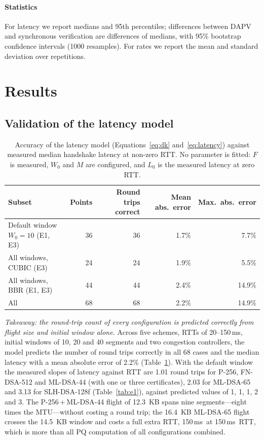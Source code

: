 \documentclass[preprint,10pt,3p]{elsarticle}
\newcommand{\ms}{\,ms}
\begin{document}
\paragraph{Statistics} For latency we report medians and 95th percentiles;
differences between DAPV and synchronous verification are differences of
medians, with 95\% bootstrap confidence intervals (1000 resamples).  For
rates we report the mean and standard deviation over repetitions.

\section{Results}
\label{sec:results}

\subsection{Validation of the latency model}
\label{sec:res_model}

\begin{table}[t]
\centering
\caption{Accuracy of the latency model (Equations~\eqref{eq:dk}
  and~\eqref{eq:latency}) against measured median handshake latency at
  non-zero RTT.  No parameter is fitted: $F$ is measured,
  $W_0$ and $M$ are configured, and $L_0$ is the measured latency at zero
  RTT.}
\label{tab:model}
\small
\begin{tabular}{lrrrr}
\toprule
\textbf{Subset} & \textbf{Points} & \textbf{Round trips correct} &
  \textbf{Mean abs.\ error} & \textbf{Max.\ abs.\ error} \\
\midrule
Default window $W_0 = 10$ (E1, E3)   & 36 & 36 & 1.7\% & 7.7\% \\
All windows, CUBIC (E3)              & 24 & 24 & 1.9\% & 5.5\% \\
All windows, BBR (E1, E3)            & 44 & 44 & 2.4\% & 14.9\% \\
\midrule
All                                  & 68 & 68 & 2.2\% & 14.9\% \\
\bottomrule
\end{tabular}
\end{table}

\emph{Takeaway: the round-trip count of every configuration is predicted
correctly from flight size and initial window alone.}  Across five schemes,
RTTs of 20--150\ms, initial windows of 10, 20 and 40 segments and two
congestion controllers, the model predicts the number of round trips
correctly in all 68 cases and the median latency with a mean absolute
error of 2.2\% (Table~\ref{tab:model}).  With the default window the
measured slopes of latency against RTT are 1.01 round trips for P-256,
FN-DSA-512 and ML-DSA-44 (with one or three certificates), 2.03 for
ML-DSA-65 and 3.13 for SLH-DSA-128f (Table~\ref{tab:e1}), against predicted
values of 1, 1, 1, 2 and 3.  The P-256\,+\,ML-DSA-44 flight of 12.3~KB
spans nine segments---eight times the MTU---without costing a round trip;
the 16.4~KB ML-DSA-65 flight crosses the 14.5~KB window and costs a full
extra RTT, 150\ms\ at 150\ms\ RTT, which is more than all PQ computation of
all configurations combined.
\end{document}
